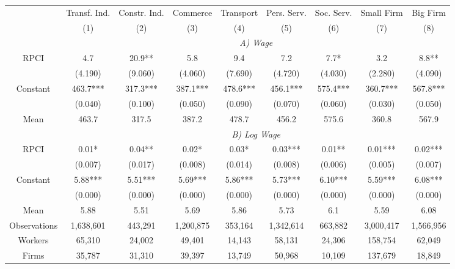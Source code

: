 \begin{tabular}{ccccccccc}
\toprule
\toprule
      & Transf. Ind. & Constr. Ind. & Commerce & Transport & Pers. Serv. & Soc. Serv. & Small Firm & Big Firm \\
      & (1)   & (2)   & (3)   & (4)   & (5)   & (6)   & (7)   & (8) \\
\cmidrule{2-9}      & \multicolumn{8}{c}{\textit{A) Wage}} \\
\midrule
RPCI  & 4.7   & 20.9** & 5.8   & 9.4   & 7.2   & 7.7*  & 3.2   & 8.8** \\
      & (4.190) & (9.060) & (4.060) & (7.690) & (4.720) & (4.030) & (2.280) & (4.090) \\
Constant & 463.7*** & 317.3*** & 387.1*** & 478.6*** & 456.1*** & 575.4*** & 360.7*** & 567.8*** \\
      & (0.040) & (0.100) & (0.050) & (0.090) & (0.070) & (0.060) & (0.030) & (0.050) \\
Mean  & 463.7 & 317.5 & 387.2 & 478.7 & 456.2 & 575.6 & 360.8 & 567.9 \\
\cmidrule{2-9}      & \multicolumn{8}{c}{\textit{B) Log Wage}} \\
\midrule
RPCI  & 0.01* & 0.04** & 0.02* & 0.03* & 0.03*** & 0.01** & 0.01*** & 0.02*** \\
      & (0.007) & (0.017) & (0.008) & (0.014) & (0.008) & (0.006) & (0.005) & (0.007) \\
Constant & 5.88*** & 5.51*** & 5.69*** & 5.86*** & 5.73*** & 6.10*** & 5.59*** & 6.08*** \\
      & (0.000) & (0.000) & (0.000) & (0.000) & (0.000) & (0.000) & (0.000) & (0.000) \\
Mean  & 5.88  & 5.51  & 5.69  & 5.86  & 5.73  & 6.1   & 5.59  & 6.08 \\
\midrule
Observations & 1,638,601 & 443,291 & 1,200,875 & 353,164 & 1,342,614 & 663,882 & 3,000,417 & 1,566,956 \\
Workers & 65,310 & 24,002 & 49,401 & 14,143 & 58,131 & 24,306 & 158,754 & 62,049 \\
Firms & 35,787 & 31,310 & 39,397 & 13,749 & 50,968 & 10,109 & 137,679 & 18,849 \\
\bottomrule
\bottomrule
\end{tabular}%
